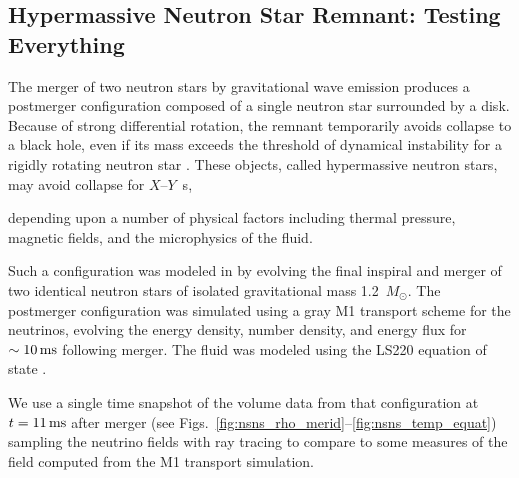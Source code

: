 \documentclass[aps,floatfix,prd,superscriptaddress,twocolumn]{revtex4-1}
\newcommand{\todo}[1]{\marginpar{\tiny{\textcolor{red}{#1}}}}
\renewcommand\todo[1]{} %
\begin{document}
\subsection{Hypermassive Neutron Star Remnant:
  Testing Everything}
\label{ssec:test_disk_comparison}
The merger of two neutron stars by gravitational wave emission produces a
postmerger configuration composed of a single neutron star surrounded by a disk.
Because of strong differential rotation, the remnant temporarily avoids
collapse to a black hole, even if its mass exceeds the threshold of dynamical
instability for a rigidly rotating neutron star \cite{duez2009-review}.
These objects, called hypermassive neutron stars,
may avoid collapse for $X\textrm{--}Y$~s,
\todo{cite $X$, $Y$}
depending upon a number of physical factors including thermal pressure,
magnetic fields, and the microphysics of the fluid.

Such a configuration was modeled in \cite{fouc2016-m1_nsns} by
evolving the final inspiral and merger of two identical neutron stars of
isolated gravitational mass 1.2~$M_{\odot}$. The postmerger configuration
was simulated using a gray M1 transport scheme for the neutrinos, evolving the
energy density, number density, and energy flux \cite{fouc2016-m1_evolve_n}
for $\sim10\,{\rm ms}$ following merger.
The fluid was modeled using the LS220 equation of state \cite{latt1991-nuc_eos}.

We use a single time snapshot of the volume data from that configuration
at $t=11\,{\rm ms}$ after merger (see
Figs.~\ref{fig:nsns_rho_merid}--\ref{fig:nsns_temp_equat})
sampling the neutrino fields with ray tracing to compare to some
measures of the field computed from the M1 transport simulation.
\todo{here focus on plots as functions of $\theta$}
\end{document}
